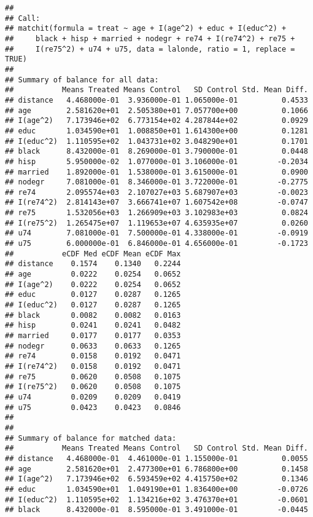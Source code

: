\documentclass[]{article}
\begin{document}
\begin{verbatim}
## 
## Call:
## matchit(formula = treat ~ age + I(age^2) + educ + I(educ^2) + 
##     black + hisp + married + nodegr + re74 + I(re74^2) + re75 + 
##     I(re75^2) + u74 + u75, data = lalonde, ratio = 1, replace = TRUE)
## 
## Summary of balance for all data:
##           Means Treated Means Control   SD Control Std. Mean Diff.
## distance   4.468000e-01  3.936000e-01 1.065000e-01          0.4533
## age        2.581620e+01  2.505380e+01 7.057700e+00          0.1066
## I(age^2)   7.173946e+02  6.773154e+02 4.287844e+02          0.0929
## educ       1.034590e+01  1.008850e+01 1.614300e+00          0.1281
## I(educ^2)  1.110595e+02  1.043731e+02 3.048290e+01          0.1701
## black      8.432000e-01  8.269000e-01 3.790000e-01          0.0448
## hisp       5.950000e-02  1.077000e-01 3.106000e-01         -0.2034
## married    1.892000e-01  1.538000e-01 3.615000e-01          0.0900
## nodegr     7.081000e-01  8.346000e-01 3.722000e-01         -0.2775
## re74       2.095574e+03  2.107027e+03 5.687907e+03         -0.0023
## I(re74^2)  2.814143e+07  3.666741e+07 1.607542e+08         -0.0747
## re75       1.532056e+03  1.266909e+03 3.102983e+03          0.0824
## I(re75^2)  1.265475e+07  1.119653e+07 4.635935e+07          0.0260
## u74        7.081000e-01  7.500000e-01 4.338000e-01         -0.0919
## u75        6.000000e-01  6.846000e-01 4.656000e-01         -0.1723
##           eCDF Med eCDF Mean eCDF Max
## distance    0.1574    0.1340   0.2244
## age         0.0222    0.0254   0.0652
## I(age^2)    0.0222    0.0254   0.0652
## educ        0.0127    0.0287   0.1265
## I(educ^2)   0.0127    0.0287   0.1265
## black       0.0082    0.0082   0.0163
## hisp        0.0241    0.0241   0.0482
## married     0.0177    0.0177   0.0353
## nodegr      0.0633    0.0633   0.1265
## re74        0.0158    0.0192   0.0471
## I(re74^2)   0.0158    0.0192   0.0471
## re75        0.0620    0.0508   0.1075
## I(re75^2)   0.0620    0.0508   0.1075
## u74         0.0209    0.0209   0.0419
## u75         0.0423    0.0423   0.0846
## 
## 
## Summary of balance for matched data:
##           Means Treated Means Control   SD Control Std. Mean Diff.
## distance   4.468000e-01  4.461000e-01 1.155000e-01          0.0055
## age        2.581620e+01  2.477300e+01 6.786800e+00          0.1458
## I(age^2)   7.173946e+02  6.593459e+02 4.415750e+02          0.1346
## educ       1.034590e+01  1.049190e+01 1.836400e+00         -0.0726
## I(educ^2)  1.110595e+02  1.134216e+02 3.476370e+01         -0.0601
## black      8.432000e-01  8.595000e-01 3.491000e-01         -0.0445

\end{verbatim}
\end{document}
